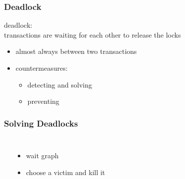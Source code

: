 \documentclass[dvipsnames]{beamer}
\theoremstyle{plain}
\begin{document}
\begin{frame}
  \frametitle{Deadlock}

  \begin{definition}
    \alert{deadlock}:\\
      transactions are waiting for each other to release the locks
  \end{definition}

  \pause
  \begin{itemize}
    \item almost always between two transactions
    \item countermeasures:
    \begin{itemize}
      \item detecting and solving
      \item preventing
    \end{itemize}
  \end{itemize}
\end{frame}

\begin{frame}
  \frametitle{Solving Deadlocks}

  \begin{columns}[t]
    \begin{example}
      \begin{center}
      \end{center}
    \end{example}

    \begin{itemize}
      \item wait graph

      \pause
      \item choose a \alert{victim} and kill it
    \end{itemize}
  \end{columns}
\end{frame}
\end{document}
